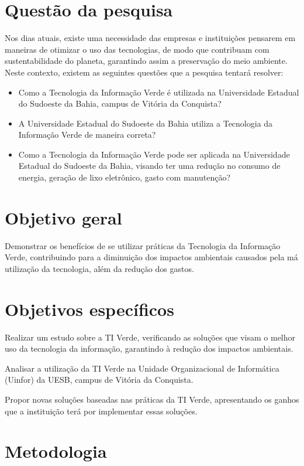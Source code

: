 \section{Questão da pesquisa}
Nos dias atuais, existe uma necessidade das empresas e instituições pensarem em maneiras de otimizar o uso das tecnologias, de modo que contribuam com sustentabilidade do planeta, garantindo assim a preservação do meio ambiente. Neste contexto, existem as seguintes questões que a pesquisa tentará resolver:
\begin{itemize}
    \item Como a Tecnologia da Informação Verde é utilizada na Universidade Estadual do Sudoeste da Bahia, campus de Vitória da Conquista?
    \item A Universidade Estadual do Sudoeste da Bahia utiliza a Tecnologia da Informação Verde de maneira correta?
    \item Como a Tecnologia da Informação Verde pode ser aplicada na Universidade Estadual do Sudoeste da Bahia, visando ter uma redução no consumo de energia, geração de lixo eletrônico, gasto com manutenção?
\end{itemize}

 
\section{Objetivo geral}
Demonstrar os benefícios de se utilizar práticas da Tecnologia da Informação Verde, contribuindo para a diminuição dos impactos ambientais causados pela má utilização da tecnologia, além da redução dos gastos. 

\section{Objetivos específicos}
Realizar um estudo sobre a TI Verde, verificando as soluções que visam o melhor uso da tecnologia da informação, garantindo à redução dos impactos ambientais.
 
Analisar a utilização da TI Verde na Unidade Organizacional de Informática (Uinfor) da UESB, campus de Vitória da Conquista.  

Propor novas soluções baseadas nas práticas da TI Verde, apresentando os ganhos que a instituição terá por implementar essas soluções.


\section{Metodologia}

